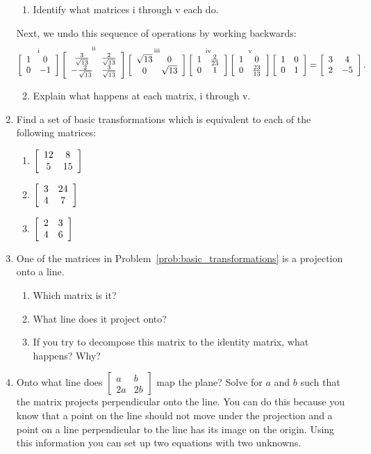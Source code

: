 \documentclass[../gatm.tex]{subfiles}
\begin{document}
\begin{enumerate}
\begin{enumerate}
\item Identify what matrices i through v each do.
\end{enumerate}
Next, we undo this sequence of operations by working backwards:
\vspace{-1em}
$$\mathop{\left[\begin{array}{cc} 1 & 0 \\ 0 & -1 \end{array}\right]}^{\text{i}}
\mathop{\left[\begin{array}{cc} \frac{3}{\sqrt{13}} & \frac{2}{\sqrt{13}} \\ -\frac{2}{\sqrt{13}} & \frac{3}{\sqrt{13}} \end{array}\right]}^{\text{ii}}
\mathop{\left[\begin{array}{cc} \sqrt{13} & 0 \\ 0 & \sqrt{13} \end{array}\right]}^{\text{iii}}
\mathop{\left[\begin{array}{cc} 1 & \frac{2}{23} \\ 0 & 1 \end{array}\right]}^{\text{iv}}
\mathop{\left[\begin{array}{cc} 1 & 0 \\ 0 & \frac{23}{13} \end{array}\right]}^{\text{v}}
\left[\begin{array}{cc} 1 & 0 \\ 0 & 1 \end{array}\right]=\left[\begin{array}{cc} 3 & 4 \\ 2 & -5 \end{array}\right].$$
\begin{enumerate}
\setcounter{enumii}{1}
\item Explain what happens at each matrix, i through v.
\end{enumerate}
\item Find a set of basic transformations which is equivalent to each of the following matrices:\label{prob:basic_transformations}
\begin{multicols}{3}
\begin{enumerate}
\item $\left[\begin{array}{cc} 12 & 8 \\ 5 & 15 \end{array}\right]$
\item $\left[\begin{array}{cc} 3 & 24 \\ 4 & 7 \end{array}\right]$
\item $\left[\begin{array}{cc} 2 & 3 \\ 4 & 6 \end{array}\right]$
\end{enumerate}
\end{multicols}
\item One of the matrices in Problem~\ref{prob:basic_transformations} is a projection onto a line.
\begin{multicols}{2}
\begin{enumerate}
\item Which matrix is it?
\item What line does it project onto?
\item If you try to decompose this matrix to the identity matrix, what happens? Why?
\end{enumerate}
\end{multicols}
\item Onto what line does $\left[\begin{array}{cc} a & b \\ 2a & 2b\end{array}\right]$ map the plane? Solve for $a$ and $b$ such that the matrix projects perpendicular onto the line. You can do this because you know that a point on the line should not move under the projection and a point on a line perpendicular to the line has its image on the origin. Using this information you can set up two equations with two unknowns. \label{prob:project_the_plane}

\end{enumerate}
\end{document}
